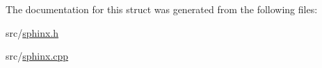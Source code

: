 The documentation for this struct was generated from the following files\-:\begin{DoxyCompactItemize}
\item 
src/\hyperlink{sphinx_8h}{sphinx.\-h}\item 
src/\hyperlink{sphinx_8cpp}{sphinx.\-cpp}\end{DoxyCompactItemize}
